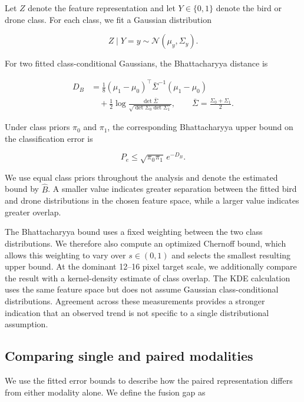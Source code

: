 \documentclass[10pt]{article}
\newcommand{\Bhat}{\widehat B}
\begin{document}
Let $Z$ denote the feature representation and let $Y\in\{0,1\}$ denote the bird or drone class. For each class, we fit a Gaussian distribution

\begin{equation}
Z \mid Y=y \sim \mathcal{N}(\mu_y,\Sigma_y).
\end{equation}

For two fitted class-conditional Gaussians, the Bhattacharyya distance is

\begin{align}
D_B
&=
\frac{1}{8}
(\mu_1-\mu_0)^\top
\bar{\Sigma}^{-1}
(\mu_1-\mu_0)
\\
&\quad+
\frac{1}{2}
\log
\frac{\det\bar{\Sigma}}
{\sqrt{\det\Sigma_0\det\Sigma_1}},
\qquad
\bar{\Sigma}
=
\frac{\Sigma_0+\Sigma_1}{2}.
\end{align}

Under class priors $\pi_0$ and $\pi_1$, the corresponding Bhattacharyya upper bound on the classification error is

\begin{equation}
P_e
\leq
\sqrt{\pi_0\pi_1}\,
e^{-D_B}.
\label{eq:bhatt}
\end{equation}

We use equal class priors throughout the analysis and denote the estimated bound by $\Bhat$. A smaller value indicates greater separation between the fitted bird and drone distributions in the chosen feature space, while a larger value indicates greater overlap.

The Bhattacharyya bound uses a fixed weighting between the two class distributions. We therefore also compute an optimized Chernoff bound, which allows this weighting to vary over $s\in(0,1)$ and selects the smallest resulting upper bound. At the dominant 12--16 pixel target scale, we additionally compare the result with a kernel-density estimate of class overlap. The KDE calculation uses the same feature space but does not assume Gaussian class-conditional distributions. Agreement across these measurements provides a stronger indication that an observed trend is not specific to a single distributional assumption.

\subsection{Comparing single and paired modalities}

We use the fitted error bounds to describe how the paired representation differs from either modality alone. We define the fusion gap as
\end{document}
